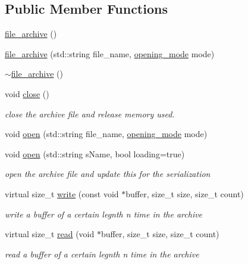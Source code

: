 \subsection*{Public Member Functions}
\begin{DoxyCompactItemize}
\item 
\hyperlink{classeternity_1_1file__archive_ab2a892aad41300e922115115b76b7754}{file\+\_\+archive} ()
\item 
\hyperlink{classeternity_1_1file__archive_a6f7dd96ce65d0be588f31286313a4b5a}{file\+\_\+archive} (std\+::string file\+\_\+name, \hyperlink{classeternity_1_1archive_a8881f9ce8dbed2ee600c64b7925afef0}{opening\+\_\+mode} mode)
\item 
\hyperlink{classeternity_1_1file__archive_a122b37e9949cd1a2f6279ed23d01d97f}{$\sim$file\+\_\+archive} ()
\item 
void \hyperlink{classeternity_1_1file__archive_aa42b3bfaf4e595f61ec07bec48676d46}{close} ()
\begin{DoxyCompactList}\small\item\em close the archive file and release memory used. \end{DoxyCompactList}\item 
void \hyperlink{classeternity_1_1file__archive_a64a17edf2cea4f1582a5a3c44eb86fa4}{open} (std\+::string file\+\_\+name, \hyperlink{classeternity_1_1archive_a8881f9ce8dbed2ee600c64b7925afef0}{opening\+\_\+mode} mode)
\item 
void \hyperlink{classeternity_1_1file__archive_a5f97e0b816c5d9406f675b25f34c21f8}{open} (std\+::string s\+Name, bool loading=true)
\begin{DoxyCompactList}\small\item\em open the archive file and update this for the serialization \end{DoxyCompactList}\item 
virtual size\+\_\+t \hyperlink{classeternity_1_1file__archive_a0eaf4b5937b3ff46df3627f64efc19e8}{write} (const void $\ast$buffer, size\+\_\+t size, size\+\_\+t count)
\begin{DoxyCompactList}\small\item\em write a buffer of a certain legnth n time in the archive \end{DoxyCompactList}\item 
virtual size\+\_\+t \hyperlink{classeternity_1_1file__archive_a307b43ac9f06c7077ac0f7e48dc0d7ab}{read} (void $\ast$buffer, size\+\_\+t size, size\+\_\+t count)
\begin{DoxyCompactList}\small\item\em read a buffer of a certain legnth n time in the archive \end{DoxyCompactList}\end{DoxyCompactItemize}

